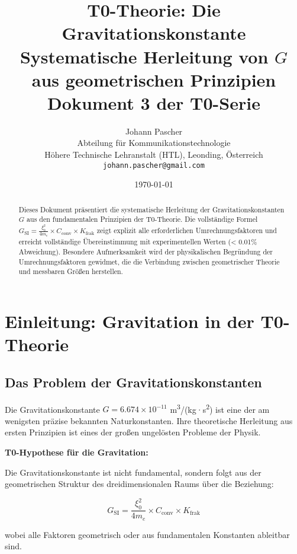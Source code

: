 \documentclass[12pt,a4paper]{article}
\title{\textbf{T0-Theorie: Die Gravitationskonstante}\\[0.5cm]
	\large Systematische Herleitung von $G$ aus geometrischen Prinzipien\\[0.3cm]
	\normalsize Dokument 3 der T0-Serie}
\author{Johann Pascher\\
	Abteilung für Kommunikationstechnologie\\
	Höhere Technische Lehranstalt (HTL), Leonding, Österreich\\
	\texttt{johann.pascher@gmail.com}}
\date{\today}
\begin{document}
	
	\maketitle
	
	\begin{abstract}
		Dieses Dokument präsentiert die systematische Herleitung der Gravitationskonstanten $G$ aus den fundamentalen Prinzipien der T0-Theorie. Die vollständige Formel $G_{\text{SI}} = \frac{\xi_0^2}{4 m_e} \times C_{\text{conv}} \times K_{\text{frak}}$ zeigt explizit alle erforderlichen Umrechnungsfaktoren und erreicht vollständige Übereinstimmung mit experimentellen Werten (< 0.01\% Abweichung). Besondere Aufmerksamkeit wird der physikalischen Begründung der Umrechnungsfaktoren gewidmet, die die Verbindung zwischen geometrischer Theorie und messbaren Größen herstellen.
	\end{abstract}
	
	\tableofcontents
	\newpage
	
	\section{Einleitung: Gravitation in der T0-Theorie}
	
	\subsection{Das Problem der Gravitationskonstanten}
	
	Die Gravitationskonstante $G = 6.674 \times 10^{-11}$ m\textsuperscript{3}/(kg·s\textsuperscript{2}) ist eine der am wenigsten präzise bekannten Naturkonstanten. Ihre theoretische Herleitung aus ersten Prinzipien ist eines der großen ungelösten Probleme der Physik.
	
	\begin{keyresult}
		\textbf{T0-Hypothese für die Gravitation:}
		
		Die Gravitationskonstante ist nicht fundamental, sondern folgt aus der geometrischen Struktur des dreidimensionalen Raums über die Beziehung:
		
		\begin{equation}
			\boxed{G_{\text{SI}} = \frac{\xi_0^2}{4 m_e} \times C_{\text{conv}} \times K_{\text{frak}}}
			\label{eq:G_complete}
		\end{equation}
		
		wobei alle Faktoren geometrisch oder aus fundamentalen Konstanten ableitbar sind.
	\end{keyresult}
	
\end{document}
